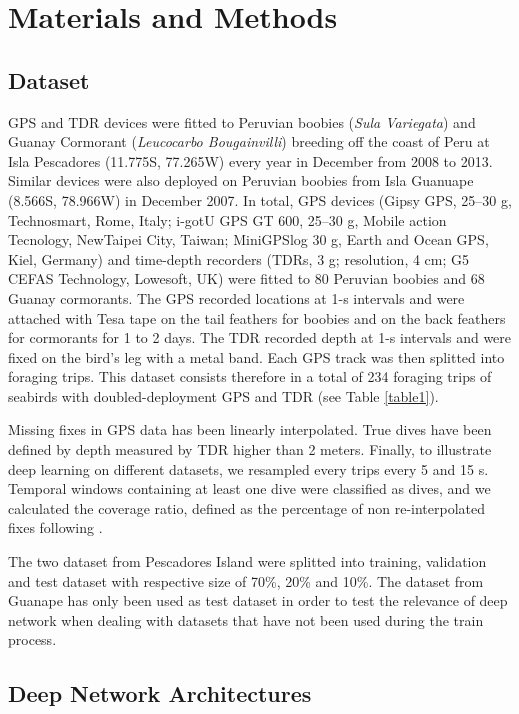 \documentclass{article}
\begin{document}
\section{Materials and Methods}
\subsection{Dataset}
GPS and TDR devices were fitted to Peruvian boobies (\textit{Sula Variegata}) and Guanay Cormorant
(\textit{Leucocarbo Bougainvilli}) breeding off the coast of Peru at Isla Pescadores (11.775\degree S, 77.265\degree W) every year in December from 2008 to 2013. Similar devices were also deployed on Peruvian boobies from Isla Guanuape (8.566\degree S, 78.966\degree W) in December 2007.
In total, GPS devices (Gipsy GPS, 25–30 g, Technosmart, Rome, Italy; i-gotU GPS GT 600, 25–30 g, Mobile action Tecnology, NewTaipei City, Taiwan; MiniGPSlog 30 g, Earth and Ocean GPS, Kiel, Germany) and time-depth recorders (TDRs, 3 g; resolution, 4 cm; G5
CEFAS Technology, Lowesoft, UK) were fitted to 80 Peruvian boobies and 68 Guanay cormorants. The GPS recorded locations at 1-s intervals and were attached with Tesa tape on the tail feathers for boobies and on the back feathers for cormorants for 1 to 2 days. The TDR recorded depth at 1-s intervals and were fixed on the bird's leg with a metal band. Each GPS track was then splitted into foraging trips. This dataset consists therefore in a total of 234 foraging trips of seabirds with doubled-deployment GPS and TDR (see Table \ref{table1}).

Missing fixes in GPS data has been linearly interpolated. True dives have been defined by depth measured by TDR higher than 2 meters. Finally, to illustrate deep learning on different datasets, we resampled every trips every 5 and 15 s. Temporal windows containing at least one dive were classified as dives, and we calculated the coverage ratio, defined as the percentage of non re-interpolated fixes following \cite{browning_predicting_2018}.

The two dataset from Pescadores Island were splitted into training, validation and test dataset with respective size of 70\%, 20\% and 10\%. The dataset from Guanape has only been used as test dataset in order to test the relevance of deep network when dealing with datasets that have not been used during the train process.

\subsection{Deep Network Architectures}
\end{document}
